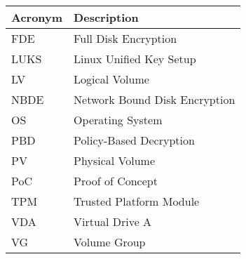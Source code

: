 \addtocounter{table}{-1}
\begin{longtable}{p{}p{}}\hline
\textbf{Acronym} & \textbf{Description}  \\\hline

FDE & Full Disk Encryption \\\hline
LUKS & Linux Unified Key Setup \\\hline
LV & Logical Volume \\\hline
NBDE & Network Bound Disk Encryption \\\hline
OS & Operating System \\\hline
PBD & Policy-Based Decryption \\\hline
PV & Physical Volume \\\hline
PoC & Proof of Concept \\\hline
TPM & Trusted Platform Module \\\hline
VDA & Virtual Drive A \\\hline
VG & Volume Group \\\hline
\end{longtable}
